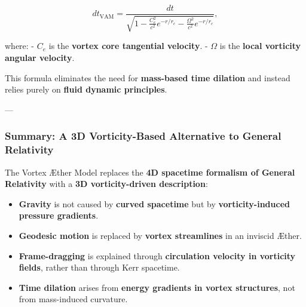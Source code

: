 \begin{equation*}
    dt_{\text{VAM}} = \frac{dt}{\sqrt{1 - \frac{C_e^2}{c^2} e^{-r/r_c} - \frac{\Omega^2}{c^2} e^{-r/r_c}}},
\end{equation*}

where:
- \( C_e \) is the \textbf{vortex core tangential velocity}.
- \( \Omega \) is the \textbf{local vorticity angular velocity}.

This formula eliminates the need for \textbf{mass-based time dilation} and instead relies purely on \textbf{fluid dynamic principles}.

---

\subsubsection*{Summary: A 3D Vorticity-Based Alternative to General Relativity}

The Vortex Æther Model replaces the \textbf{4D spacetime formalism of General Relativity} with a \textbf{3D vorticity-driven description}:

\begin{itemize}
    \item \textbf{Gravity} is not caused by \textbf{curved spacetime} but by \textbf{vorticity-induced pressure gradients}.
    \item \textbf{Geodesic motion} is replaced by \textbf{vortex streamlines} in an inviscid Æther.
    \item \textbf{Frame-dragging} is explained through \textbf{circulation velocity in vorticity fields}, rather than through Kerr spacetime.
    \item \textbf{Time dilation} arises from \textbf{energy gradients in vortex structures}, not from mass-induced curvature.
\end{itemize}
